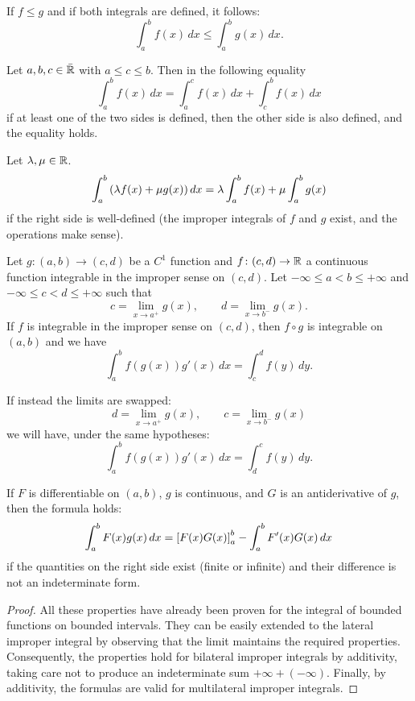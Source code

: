 \begin{theorem}
\label{th:proprieta_integrale_improprio}
If $f\le g$ and if both integrals are defined, it follows:
%
%
%
\[
  \int_a^b f(x)\, dx \le \int_a^b g(x)\, dx.
\]

Let $a,b,c \in \bar {{\mathbb R}}$ with $a\le c \le b$. Then in the following equality
%
%
%
\[
  \int_a^b f(x)\, dx = \int_a^c f(x)\, dx + \int_c^b f(x)\, dx
\]
if at least one of the two sides is defined, then the other side is also
defined, and the equality holds.

Let $\lambda, \mu \in {\mathbb R}$.
%
%
%
\[
  \int_a^b {\left( \lambda f(x) + \mu g(x) \right)}\, dx
  = \lambda \int_a^b f(x) + \mu \int_a^b g(x)
\]
if the right side is well-defined (the improper integrals of $f$ and $g$ exist,
and the operations make sense).

Let $g\colon (a,b)\to (c,d)$ be a $C^1$ function and $f\colon (c,d) \to {\mathbb R}$ a
continuous function integrable in the improper sense on $(c,d)$. Let $-\infty
\le a < b \le +\infty$ and $-\infty \le c < d \le +\infty$ such that
\[
c = \lim_{x\to a^+} g(x),
\qquad
d = \lim_{x\to b^-} g(x).
\]
If $f$ is integrable in the improper sense on $(c,d)$, then $f \circ g$ is
integrable on $(a,b)$ and we have
%
%
%
\[
\int_a^b f(g(x)) g'(x)\, dx = \int_c^d f(y)\, dy.
\]

If instead the limits are swapped:
\[
d = \lim_{x\to a^+} g(x),
\qquad
c = \lim_{x\to b^-} g(x)
\]
we will have, under the same hypotheses:
\[
  \int_a^b f(g(x)) g'(x) \, dx = \int_d^c f(y)\, dy.
\]

If $F$ is differentiable on $(a,b)$, $g$ is continuous, and $G$ is an
antiderivative of $g$, then the formula holds:
%
%
%
\[
 \int_a^b F(x)g(x)\, dx = {\left[ F(x) G(x) \right]}_a^b - \int_a^b F'(x)G(x)\, dx  
\]
if the quantities on the right side exist (finite or infinite) and their
difference is not an indeterminate form.
\end{theorem}
%
\begin{proof}
All these properties have already been proven for the integral of bounded
functions on bounded intervals. They can be easily extended to the lateral
improper integral by observing that the limit maintains the required properties.
Consequently, the properties hold for bilateral improper integrals by
additivity, taking care not to produce an indeterminate sum $+\infty +
(-\infty)$. Finally, by additivity, the formulas are valid for multilateral
improper integrals.
\end{proof}

